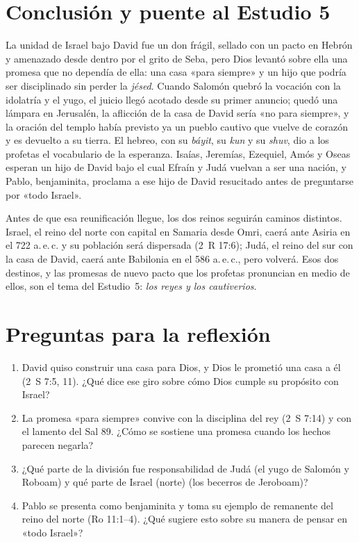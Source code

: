 \documentclass[11pt,letterpaper]{article}
\begin{document}
\section{Conclusión y puente al Estudio 5}

La unidad de Israel bajo David fue un don frágil, sellado con un pacto en Hebrón y amenazado desde dentro por el grito de Seba, pero Dios levantó sobre ella una promesa que no dependía de ella: una casa «para siempre» y un hijo que podría ser disciplinado sin perder la \emph{jésed}. Cuando Salomón quebró la vocación con la idolatría y el yugo, el juicio llegó acotado desde su primer anuncio; quedó una lámpara en Jerusalén, la aflicción de la casa de David sería «no para siempre», y la oración del templo había previsto ya un pueblo cautivo que vuelve de corazón y es devuelto a su tierra. El hebreo, con su \emph{báyit}, su \emph{kun} y su \emph{shuv}, dio a los profetas el vocabulario de la esperanza. Isaías, Jeremías, Ezequiel, Amós y Oseas esperan un hijo de David bajo el cual Efraín y Judá vuelvan a ser una nación, y Pablo, benjaminita, proclama a ese hijo de David resucitado antes de preguntarse por «todo Israel».

Antes de que esa reunificación llegue, los dos reinos seguirán caminos distintos. Israel, el reino del norte con capital en Samaria desde Omri, caerá ante Asiria en el 722 a.\,e.\,c. y su población será dispersada (2~R 17:6); Judá, el reino del sur con la casa de David, caerá ante Babilonia en el 586 a.\,e.\,c., pero volverá. Esos dos destinos, y las promesas de nuevo pacto que los profetas pronuncian en medio de ellos, son el tema del Estudio~5: \emph{los reyes y los cautiverios}.

\section*{Preguntas para la reflexión}
\begin{enumerate}
\item David quiso construir una casa para Dios, y Dios le prometió una casa a él (2~S 7:5, 11). ¿Qué dice ese giro sobre cómo Dios cumple su propósito con Israel?
\item La promesa «para siempre» convive con la disciplina del rey (2~S 7:14) y con el lamento del Sal 89. ¿Cómo se sostiene una promesa cuando los hechos parecen negarla?
\item ¿Qué parte de la división fue responsabilidad de Judá (el yugo de Salomón y Roboam) y qué parte de Israel (norte) (los becerros de Jeroboam)?
\item Pablo se presenta como benjaminita y toma su ejemplo de remanente del reino del norte (Ro 11:1--4). ¿Qué sugiere esto sobre su manera de pensar en «todo Israel»?
\end{enumerate}
\end{document}
